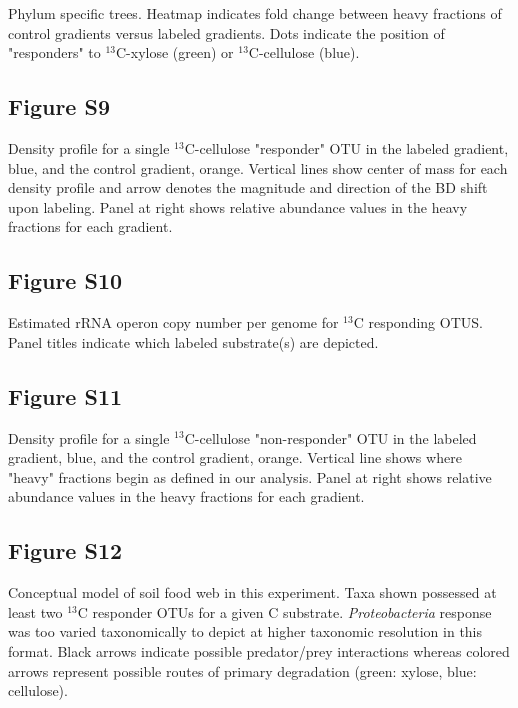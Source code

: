 Phylum specific trees. Heatmap indicates fold change between heavy fractions of control gradients versus labeled gradients. Dots indicate the position of "responders" to $^{13}$C-xylose (green) or $^{13}$C-cellulose (blue).\subsection{Figure S9}
Density profile for a single $^{13}$C-cellulose "responder" OTU in the labeled gradient, blue, and the control gradient, orange. Vertical lines show center of mass for each density profile and arrow denotes the magnitude and direction of the BD shift upon labeling. Panel at right shows relative abundance values in the heavy fractions for each gradient. \subsection{Figure S10}
Estimated rRNA operon copy number per genome for $^{13}$C responding OTUS. Panel titles indicate which labeled substrate(s) are depicted.\subsection{Figure S11}
Density profile for a single $^{13}$C-cellulose "non-responder" OTU in the labeled gradient, blue, and the control gradient, orange. Vertical line shows where "heavy" fractions begin as defined in our analysis. Panel at right shows relative abundance values in the heavy fractions for each gradient.\subsection{Figure S12}
Conceptual model of soil food web in this experiment. Taxa shown possessed at least two $^{13}$C responder OTUs for a given C substrate. \textit{Proteobacteria} response was too varied taxonomically to depict at higher taxonomic resolution in this format. Black arrows indicate possible predator/prey interactions whereas colored arrows represent possible routes of primary degradation (green: xylose, blue: cellulose).